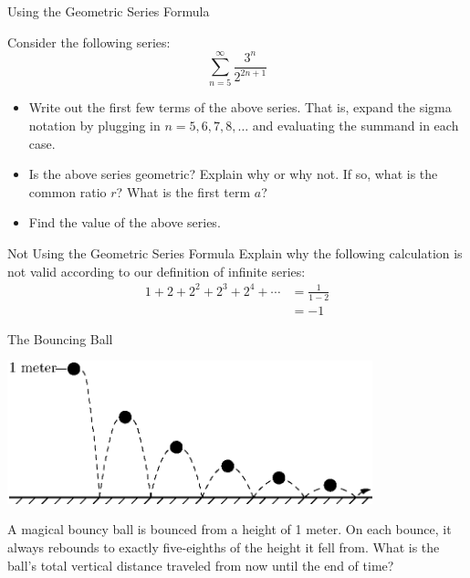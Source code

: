 \begin{exercise}{Using the Geometric Series Formula \Coffeecup \Coffeecup}

 Consider the following series: $$ \sum_{n=5}^{\infty} \frac{3^n}{2^{2n+1}}$$
\begin{itemize}
\item  Write out the first few terms of the above series.  That is, expand the sigma notation by plugging in $n=5,6,7,8,\ldots$ and evaluating the summand in each case.

\vspace*{1in}

\item  Is the above series geometric?  Explain why or why not.  If so, what is the common ratio $r$?  What is the first term $a$?

\vspace*{1in}

\item  Find the value of the above series.

\vspace*{1in}

\end{itemize}
\end{exercise}
\begin{exercise}{Not Using the Geometric Series Formula \Coffeecup}
Explain why the following calculation is not valid according to our definition of infinite series:
\begin{align*}
1+2+2^2+2^3+2^4+\cdots &=\frac{1}{1-2} \\
&=-1
\end{align*}
\end{exercise}
\begin{exercise}{The Bouncing Ball \Coffeecup \Coffeecup}
	\begin{center}
		\includegraphics[width=300pt]{ChapterSeqSer/Figures/ball.eps}        
	\end{center}
    A magical bouncy ball is bounced from a height of 1 meter.  On each bounce, it always rebounds to exactly five-eighths of the height it fell from.  What is the ball's total vertical distance traveled from now until the end of time?
    \vspace*{1in}
\end{exercise}

